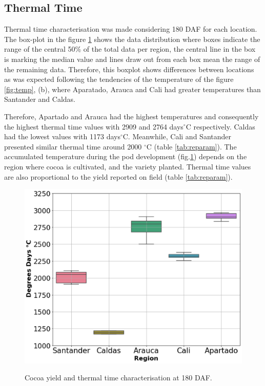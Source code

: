 \documentclass[gene,journal,article,submit,moreauthors,pdftex]{Definitions/mdpi}
\begin{document}
\subsection{Thermal Time }

Thermal time characterisation was made considering 180 DAF for each location. The box-plot in the figure \ref{fig:ttbox} shows the data distribution where boxes indicate the range of the central 50\% of the total data per region, the central line in the box is marking the median value and lines draw out from each box mean the range of the remaining data. Therefore, this boxplot shows differences between locations as was expected following the tendencies of the temperature of the figure \ref{fig:temp}, (b), where Aparatado, Arauca and Cali had greater temperatures than Santander and Caldas. 

Therefore, Apartado and Arauca had the highest temperatures and consequently the highest thermal time values with 2909 and 2764 days$^\circ$C  respectively. Caldas had the lowest values with 1173 days$^\circ$C. Meanwhile, Cali and Santander presented similar thermal time around 2000 $^\circ$C (table \ref{tab:reparam}). The accumulated temperature during the pod development (fig.\ref{fig:ttbox}) depends on the region where cocoa is cultivated, and the variety planted. Thermal time values are also proportional to the yield reported on field (table \ref{tab:reparam}). \\

\begin{figure}[h!]
	\centering
	\includegraphics[scale=0.2]{images/ttbbox.png}\\
	\caption{\footnotesize {Cocoa yield and thermal time characterisation at 180 DAF.\\}}
	\label{fig:ttbox}
\end{figure}
\end{document}
